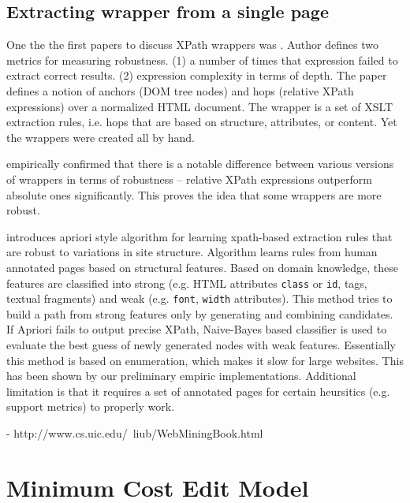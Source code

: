 \subsection{Extracting wrapper from a single page}

One the the first papers to discuss XPath wrappers was \cite{Myllymaki02robustweb}. Author defines two metrics for measuring robustness. (1) a number of times that expression failed to extract correct results. (2) expression complexity in terms of depth. The paper defines a notion of anchors (DOM tree nodes) and hops (relative XPath expressions) over a normalized HTML document. The wrapper is a set of XSLT extraction rules, i.e. hops that are based on structure, attributes, or content. Yet the wrappers were created all by hand.

\cite{Kowalkiewicz:2006:RWC:1135777.1135928} empirically confirmed that there is a notable difference between various versions of wrappers in terms of robustness – relative XPath expressions outperform absolute ones significantly. This proves the idea that some wrappers are more robust.

\cite{DBLP:conf/icde/GulhaneMMRRSSTT11} introduces apriori style algorithm for learning xpath-based extraction rules that are robust to variations in site structure. Algorithm learns rules from human annotated pages based on structural features. Based on domain knowledge, these features are classified into strong (e.g. HTML attributes \texttt{class} or \texttt{id}, tags, textual fragments) and weak (e.g. \texttt{font}, \texttt{width} attributes). This method tries to build a path from strong features only by generating and combining candidates. If Apriori fails to output precise XPath, Naive-Bayes based classifier is used to evaluate the best guess of newly generated nodes with weak features. Essentially this method is based on enumeration, which makes it slow for large websites. This has been shown by our preliminary empiric implementations. Additional limitation is that it requires a set of annotated pages for certain heursitics (e.g. support metrics) to properly work. 

\cite{Thomsen:2012:WWS:2364120.2364156}

- http://www.cs.uic.edu/~liub/WebMiningBook.html\\


\section{Minimum Cost Edit Model}


